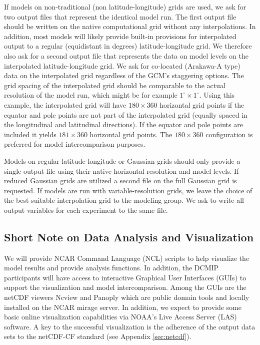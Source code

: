 \documentclass[times,doublespace]{fldauth}
\begin{document}
If models on non-traditional (non latitude-longitude) grids are used, we ask for two output files that represent the identical model run. The first output file should be written on the native computational grid without any interpolations. In addition, most models will likely provide built-in provisions for interpolated output to a regular (equidistant in degrees) latitude-longitude grid. We therefore also ask for a second output file that represents the data on model levels on the interpolated latitude-longitude grid. We ask for co-located  (Arakawa-A type) data on the interpolated grid regardless of the GCM's staggering options. The grid spacing of the interpolated grid should be comparable to the actual resolution of the model run, which might be for example $1^\circ \times 1^\circ$. Using this example, the interpolated grid will have $180 \times 360$ horizontal grid points if the equator and pole points are not part of the interpolated grid (equally spaced in the longitudinal and latitudinal directions). If the equator and pole points are included it yields $181 \times 360$ horizontal grid points. The $180 \times 360$ configuration is preferred for model intercomparison purposes.

Models on regular latitude-longitude or Gaussian grids should only provide a single output file using their native horizontal resolution and model levels. If reduced Gaussian grids are utilized a second file on the full Gaussian grid is requested. 
If models are run with variable-resolution grids, we leave the choice of the best suitable interpolation grid to the modeling group. We ask to write all output variables for each experiment to the same file.

\subsection{Short Note on Data Analysis and Visualization}
We will provide NCAR Command Language (NCL) scripts to help visualize the model results and provide analysis functions. In addition, the DCMIP participants will have access to interactive Graphical User Interfaces (GUIs) to support the visualization and model intercomparison. Among the GUIs are the netCDF viewers Ncview and Panoply which are public domain tools and locally installed on the NCAR mirage server. In addition, we expect to provide some basic online visualization capabilities via NOAA's Live Access Server (LAS) software. A key to the successful visualization is the adherence of the output data sets to the netCDF-CF standard (see Appendix \ref{sec:netcdf}).
\end{document}
